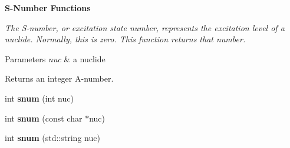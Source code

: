 \begin{Indent}{\bf S-\/\+Number Functions}\par
{\em The S-\/number, or excitation state number, represents the excitation level of a nuclide. Normally, this is zero. This function returns that number. 
\begin{DoxyParams}{Parameters}
{\em nuc} & a nuclide \\
\hline
\end{DoxyParams}
\begin{DoxyReturn}{Returns}
an integer A-\/number. 
\end{DoxyReturn}
}\begin{DoxyCompactItemize}
\item 
int {\bfseries snum} (int nuc)\hypertarget{namespacepyne_1_1nucname_ad48fe72b30c8cdcc16156f4a4991af6b}{}\label{namespacepyne_1_1nucname_ad48fe72b30c8cdcc16156f4a4991af6b}

\item 
int {\bfseries snum} (const char $\ast$nuc)\hypertarget{namespacepyne_1_1nucname_a49f66e27e2a54300ad0f441ce4644235}{}\label{namespacepyne_1_1nucname_a49f66e27e2a54300ad0f441ce4644235}

\item 
int {\bfseries snum} (std\+::string nuc)\hypertarget{namespacepyne_1_1nucname_a561dc9f333b1f890793caa4d7f6eb46b}{}\label{namespacepyne_1_1nucname_a561dc9f333b1f890793caa4d7f6eb46b}

\end{DoxyCompactItemize}
\end{Indent}
